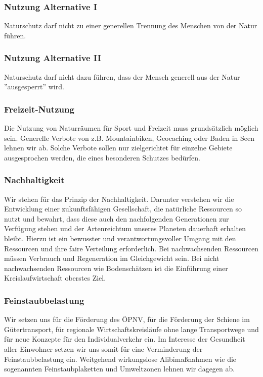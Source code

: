 \subsubsection{Nutzung Alternative I}
\abstimmung
Naturschutz darf nicht zu einer generellen Trennung des Menschen von der Natur führen.

\subsubsection{Nutzung Alternative II}
\abstimmung
Naturschutz darf nicht dazu führen, dass der Mensch generell aus der Natur ''ausgesperrt'' wird.

\subsubsection{Freizeit-Nutzung}
\abstimmung
Die Nutzung von Naturräumen für Sport und Freizeit muss grundsätzlich möglich sein. Generelle Verbote von z.B. Mountainbiken, Geocaching oder Baden in Seen lehnen wir ab. Solche Verbote sollen nur zielgerichtet für einzelne Gebiete ausgesprochen werden, die eines besonderen Schutzes bedürfen.
 

\subsubsection{Nachhaltigkeit}
\abstimmung
Wir stehen für das Prinzip der Nachhaltigkeit. Darunter verstehen wir die Entwicklung einer zukunftsfähigen Gesellschaft, die natürliche Ressourcen so nutzt und bewahrt, dass diese auch den nachfolgenden Generationen zur Verfügung stehen und der Artenreichtum unseres Planeten dauerhaft erhalten bleibt. Hierzu ist ein bewusster und verantwortungsvoller Umgang mit den Ressourcen und ihre faire Verteilung erforderlich. Bei nachwachsenden Ressourcen müssen Verbrauch und Regeneration im Gleichgewicht sein. Bei nicht nachwachsenden Ressourcen wie Bodenschätzen ist die Einführung einer Kreislaufwirtschaft oberstes Ziel.
 

\subsubsection{Feinstaubbelastung}
Wir setzen uns für die Förderung des ÖPNV, für die Förderung der Schiene im Gütertransport, für regionale Wirtschaftskreisläufe ohne lange Transportwege und für neue Konzepte für den Individualverkehr ein. Im Interesse der Gesundheit aller Einwohner setzen wir uns somit für eine Verminderung der Feinstaubbelastung ein. Weitgehend wirkungslose Alibimaßnahmen wie die sogenannten Feinstaubplaketten und Umweltzonen lehnen wir dagegen ab.